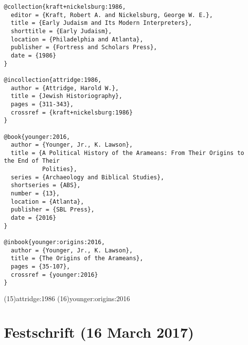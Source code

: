 \documentclass[a4paper]{article}
\begin{document}
\begin{verbatim}
@collection{kraft+nickelsburg:1986,
  editor = {Kraft, Robert A. and Nickelsburg, George W. E.},
  title = {Early Judaism and Its Modern Interpreters},
  shorttitle = {Early Judaism},
  location = {Philadelphia and Atlanta},
  publisher = {Fortress and Scholars Press},
  date = {1986}
}

@incollection{attridge:1986,
  author = {Attridge, Harold W.},
  title = {Jewish Historiography},
  pages = {311-343},
  crossref = {kraft+nickelsburg:1986}
}

@book{younger:2016,
  author = {Younger, Jr., K. Lawson},
  title = {A Political History of the Arameans: From Their Origins to the End of Their
           Polities},
  series = {Archaeology and Biblical Studies},
  shortseries = {ABS},
  number = {13},
  location = {Atlanta},
  publisher = {SBL Press},
  date = {2016}
}

@inbook{younger:origins:2016,
  author = {Younger, Jr., K. Lawson},
  title = {The Origins of the Arameans},
  pages = {35-107},
  crossref = {younger:2016}
}
\end{verbatim}

\examplecite(15){attridge:1986}
\examplecite(16){younger:origins:2016}
\exampleabbreviations
\examplebibliography
{}

\section{Festschrift (16 March 2017)}
\end{document}
